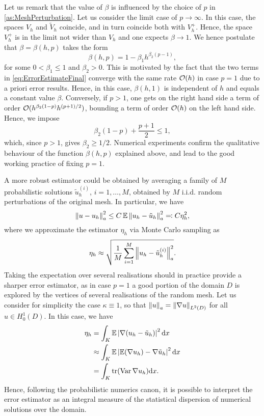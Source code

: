 \documentclass[10pt]{article}
\begin{document}
\begin{remark} Let us remark that the value of $\beta$ is influenced by the choice of $p$ in \cref{as:MeshPerturbation}. Let us consider the limit case of $p \to \infty$. In this case, the spaces $V_h$ and $\tilde V_h$ coincide, and in turn coincide both with $V_h^+$. Hence, the space $V_h^+$ is in the limit not wider than $V_h$ and one expects $\beta \to 1$. We hence postulate that $\beta = \beta(h, p)$ takes the form
	\begin{equation}
		\beta(h, p) = 1 - \beta_1 h^{\beta_2(p-1)},
	\end{equation}
	for some $0 < \beta_1 \leq 1$ and $\beta_2 > 0$. This is motivated by the fact that the two terms in \eqref{eq:ErrorEstimateFinal} converge with the same rate $\mathcal{O}(h)$ in case $p = 1$ due to a priori error results. Hence, in this case, $\beta(h, 1)$ is independent of $h$ and equals a constant value $\beta$. Conversely, if $p > 1$, one gets on the right hand side a term of order $\mathcal{O}(h^{\beta_2(1-p)} h^{(p+1)/2})$, bounding a term of order $\mathcal{O}(h)$ on the left hand side. Hence, we impose
	\begin{equation}
		\beta_2(1-p) + \frac{p+1}{2} \leq 1,
	\end{equation}
	which, since $p > 1$, gives $\beta_2 \geq 1/2$. Numerical experiments confirm the qualitative behaviour of the function $\beta(h, p)$ explained above, and lead to the good working practice of fixing $p = 1$.
\end{remark}

A more robust estimator could be obtained by averaging a family of $M$ probabilistic solutions $\tilde u_h^{(i)}$, $i = 1, \ldots, M$, obtained by $M$ i.i.d. random perturbations of the original mesh. In particular, we have 
\begin{equation}
	\left\|u - u_h\right\|_a^2 \leq C \operatorname{\mathbb{E}} \left\|u_h - \tilde u_h\right\|_a^2 \eqqcolon C \eta_h^2,
\end{equation}
where we approximate the estimator $\eta_h$ via Monte Carlo sampling as
\begin{equation}
	\eta_h \approx \sqrt{\frac{1}{M} \sum_{i=1}^M \left\|u_h - \tilde u_h^{(i)}\right\|_a^2}.
\end{equation}
Taking the expectation over several realisations should in practice provide a sharper error estimator, as in case $p = 1$ a good portion of the domain $D$ is explored by the vertices of several realisations of the random mesh. Let us consider for simplicity the case $\kappa \equiv 1$, so that $\left\|u\right\|_a = \left\|\nabla u\right\|_{L^2(D)}$ for all $u \in H^1_0(D)$. In this case, we have
\begin{equation}
\begin{aligned}
	\eta_h &= \int_{K} \operatorname{\mathbb{E}} \left\lvert\nabla (u_h - \tilde u_h)\right\rvert^2 \mathrm{d} x\\
		   &\approx \int_{K} \operatorname{\mathbb{E}} \left\lvert\operatorname{\mathbb{E}} (\nabla u_h) - \nabla \tilde u_h\right\rvert^2 \mathrm{d} x\\
		   &= \int_K \operatorname{tr} (\operatorname{Var} \nabla u_h) \mathrm{d} x.
\end{aligned}
\end{equation}   
Hence, following the probabilistic numerics canon, it is possible to interpret the error estimator as an integral measure of the statistical dispersion of numerical solutions over the domain.
\end{document}
